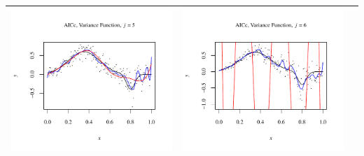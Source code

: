 \documentclass[11pt]{article}
\begin{document}
\begin{table}[h!]
\begin{center}
\begin{tabular}{| >{\centering\arraybackslash}m{2.1in} |  >{\centering\arraybackslash}m{2.1in} |  >{\centering\arraybackslash}m{2.1in}|}
      \includegraphics[width=1\linewidth,height=0.18\textheight]{Graphs/3/4/assignment5_a_3_4_5}&
      \includegraphics[width=1\linewidth,height=0.18\textheight]{Graphs/3/4/assignment5_a_3_4_6}\\\hline
    \end{tabular}
  \end{center}
\end{table}
\end{document}
